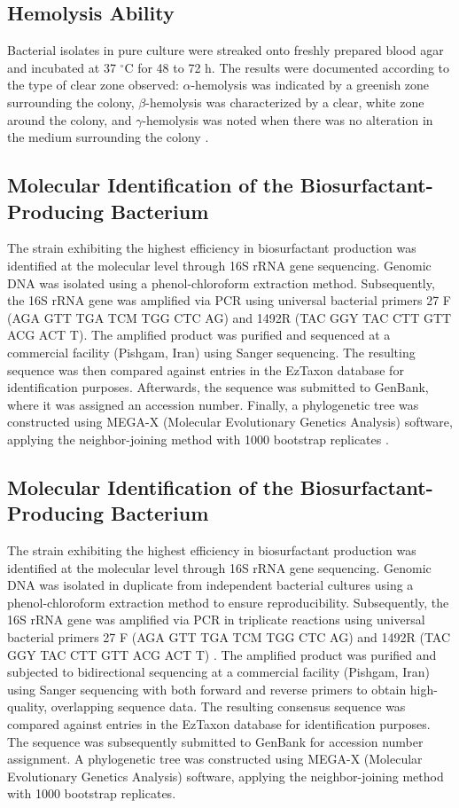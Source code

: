 \documentclass{svjour3}
\begin{document}
\subsection{Hemolysis Ability}
Bacterial isolates in pure culture were streaked onto freshly prepared blood agar and incubated at 37 $^{\circ}$C for 48 to 72 h. The results were documented according to the type of clear zone observed: $\alpha$-hemolysis was indicated by a greenish zone surrounding the colony, $\beta$-hemolysis was characterized by a clear, white zone around the colony, and $\gamma$-hemolysis was noted when there was no alteration in the medium surrounding the colony \cite{23}.
\subsection{Molecular Identification of the Biosurfactant-Producing Bacterium}
The strain exhibiting the highest efficiency in biosurfactant production was identified at the molecular level through 16S rRNA gene sequencing. Genomic DNA was isolated using a phenol-chloroform extraction method. Subsequently, the 16S rRNA gene was amplified via PCR using universal bacterial primers 27 F (AGA GTT TGA TCM TGG CTC AG) and 1492R (TAC GGY TAC CTT GTT ACG ACT T). The amplified product was purified and sequenced at a commercial facility (Pishgam, Iran) using Sanger sequencing. The resulting sequence was then compared against entries in the EzTaxon database for identification purposes. Afterwards, the sequence was submitted to GenBank, where it was assigned an accession number. Finally, a phylogenetic tree was constructed using MEGA-X (Molecular Evolutionary Genetics Analysis) software, applying the neighbor-joining method with 1000 bootstrap replicates \cite{24, 25}.
\subsection{Molecular Identification of the Biosurfactant-Producing Bacterium}
The strain exhibiting the highest efficiency in biosurfactant production was identified at the molecular level through 16S rRNA gene sequencing. Genomic DNA was isolated in duplicate from independent bacterial cultures using a phenol-chloroform extraction method to ensure reproducibility. Subsequently, the 16S rRNA gene was amplified via PCR in triplicate reactions using universal bacterial primers 27 F (AGA GTT TGA TCM TGG CTC AG) and 1492R (TAC GGY TAC CTT GTT ACG ACT T) \cite{26}. The amplified product was purified and subjected to bidirectional sequencing at a commercial facility (Pishgam, Iran) using Sanger sequencing with both forward and reverse primers to obtain high-quality, overlapping sequence data. The resulting consensus sequence was compared against entries in the EzTaxon database for identification purposes. The sequence was subsequently submitted to GenBank for accession number assignment. A phylogenetic tree was constructed using MEGA-X (Molecular Evolutionary Genetics Analysis) software, applying the neighbor-joining method with 1000 bootstrap replicates.
\end{document}
